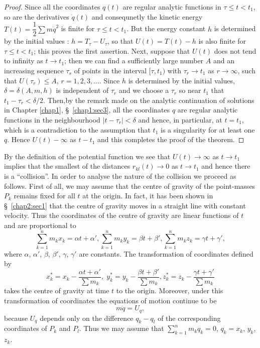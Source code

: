\begin{proof}
Since all the coordinates $q(t)$ are regular analytic functions in $\tau \leq t < t_1$, so are the derivatives $\dot{q}(t)$ and consequnetly the kinetic energy $T(t) = \dfrac{1}{2} \sum m \dot{q}^2$ is finite for $\tau \leq t < t_1$. But the energy constant $h$ is determined by the initial values : $h = T_\tau - U_\tau$, so that $U(t) = T(t) -h$ is also finite for $\tau \leq t < t_1$; this proves the first assertion. Next, suppose that $U(t)$ does not tend to infinity as $t \to t_1$; then we can find a sufficiently large number $A$ and an increasing sequence $\tau_s$ of points in the interval $[\tau, t_1)$ with $\tau_r \to t_1$ as $r \to \infty$, such that $U(\tau_r) \leq A$, $r = 1, 2, 3, \ldots$. Since $h$ is determined by the initial values, $\delta = \delta (A, m, h)$ is independent of $\tau_r$ and we choose a $\tau_r$ so near $t_1$ that $t_1 - \tau_r < \delta/2$. Then,\pageoriginale by the remark made on the analytic continuation of solutions in Chapter \ref{chap1}, \S\ \ref{chap1:sec3}, all the coordinates $q$ are regular analytic functions in the neighbourhood $|t-\tau_r| < \delta$ and hence, in particular, at $t = t_1$, which is a contradiction to the assumption that $t_1$ is a singularity for at least one $q$. Hence $U(t) - \infty$ as $t - t_1$ and this completes the proof of the theorem.
\end{proof}

By the definition of the potential function we see that $U(t) \to \infty$ as $t \to t_1$ implies that the smallest of the distances $r_{kl}(t) \to 0$ as $t \to t_1$ and hence there is a ``collision''. In order to analyse the nature of the collision we proceed as follows. First of all, we may assume that the centre of gravity of the point-masses $P_k$ remains fixed for all $t$ at the origin. In fact, it has been shown in \S\ \ref{chap2:sec1} that the centre of gravity moves in a straight line with constant velocity. Thus the coordinates of the centre of gravity are linear functions of $t$ and are proportional to
$$
\sum\limits^n_{k=1} m_k x_k = \alpha t + \alpha', \sum\limits^n_{k=1} m_k y_k = \beta t + \beta', \sum\limits^n_{k=1} m_k z_k = \gamma t + \gamma', 
$$
where $\alpha$, $\alpha'$, $\beta$, $\beta'$, $\gamma$, $\gamma'$ are constants. The transformation of coordinates defined by
$$
x^*_k = x_k - \frac{\alpha t + \alpha'}{\sum m_k}, \; y^*_k = y_k -\frac{\beta t + \beta'}{\sum m_k}, z^*_k = z_k - \frac{\gamma t + \gamma'}{\sum m_k}
$$
takes the centre of gravity at time $t$ to the origin. Moreover, under this transformation of coordinates the equations of motion continue to be 
\begin{equation*}
m \ddot{q} = U_q,\tag{2.2.1}\label{chap2:eq2.2.1} 
\end{equation*}\pageoriginale
because $U_q$ depends only on the difference $q_k - q_l$ of the corresponding coordinates of $P_k$ and $P_l$. Thus we may assume that $\sum\limits^n_{k=1} m_k q_k = 0$, $q_k = x_k$, $y_k$, $z_k$.

